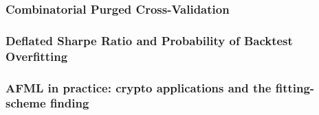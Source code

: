 \documentclass[12pt,a4paper,oneside]{article}
\begin{document}
\subsubsection{Combinatorial Purged Cross-Validation}\label{subsubsec:afml_cpcv}

%


\subsubsection{Deflated Sharpe Ratio and Probability of Backtest Overfitting}\label{subsubsec:afml_dsr_pbo}

%


\subsubsection{AFML in practice: crypto applications and the fitting-scheme finding}\label{subsubsec:afml_crypto_hard}
\end{document}
